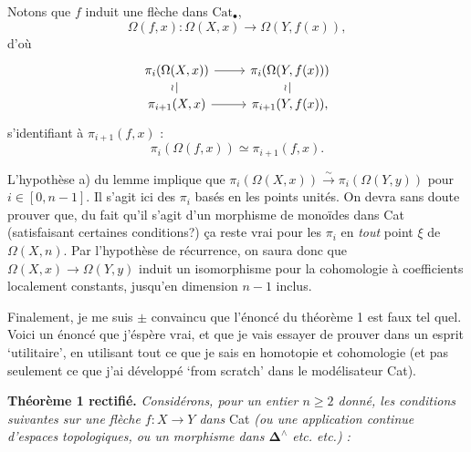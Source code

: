 Notons que $f$ induit une flèche dans $\mathrm{Cat}_\bullet$,
\[
\Omega(f,x) : \Omega(X,x) \longrightarrow \Omega(Y,f(x)),
\]
d'où
\[
\begin{tikzcd}[row sep=small]
\pi_i(\Omega(X,x)) \arrow[r] \arrow[d, dash, "\wr"'] & \pi_i(\Omega(Y,f(x))) \arrow[d, dash, "\wr"'] \\
\pi_{i+1}(X,x) \arrow[r] & \pi_{i+1}(Y,f(x)),
\end{tikzcd}
\]
s'identifiant à $\pi_{i+1}(f,x)$ :
\[
\pi_i(\Omega(f,x)) \simeq \pi_{i+1}(f,x).
\]



L'hypothèse a) du lemme implique que $\pi_i(\Omega(X,x)) \xrightarrow{\sim} \pi_i(\Omega(Y,y))$ pour $i \in [0,n-1]$. Il s'agit ici des $\pi_i$ basés en les points unités. On devra sans doute prouver que, du fait qu'il s'agit d'un morphisme de monoïdes dans Cat (satisfaisant certaines conditions?) ça reste vrai pour les $\pi_i$ en \textit{tout} point $\xi$ de $\Omega(X,n)$. Par l'hypothèse de récurrence, on saura donc que $\Omega(X,x) \longrightarrow \Omega(Y,y)$ %
induit un isomorphisme pour la cohomologie à coefficients localement constants, jusqu'en dimension $n-1$ inclus.

Finalement, je me suis $\pm$ convaincu que l'énoncé du théorème 1 est faux tel quel. Voici un énoncé que j'éspère vrai, et que je vais essayer de prouver dans un esprit `utilitaire', en utilisant tout ce que je sais en homotopie et cohomologie (et pas seulement ce que j'ai développé `from scratch' dans le modélisateur Cat). %

\textbf{Théorème 1 rectifié.} \textit{Considérons, pour un entier $n \geq 2$ donné, les conditions suivantes sur une flèche $f : X \longrightarrow Y$ dans} Cat \textit{(ou une application continue d'espaces topologiques, ou un morphisme dans $\mathbf{\Delta}^\wedge$ etc. etc.) :}

